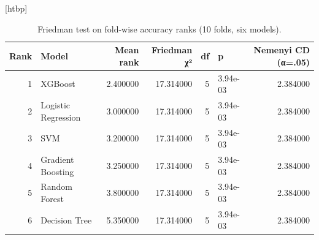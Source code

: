 \begin{table}
\small[htbp]
\caption{Friedman test on fold-wise accuracy ranks (10 folds, six models).}
\label{tab:A02_friedman}
\begin{tabular}{rlrrrlr}
\toprule
Rank & Model & Mean rank & Friedman χ² & df & p & Nemenyi CD (α=.05) \\
\midrule
1 & XGBoost & 2.400000 & 17.314000 & 5 & 3.94e-03 & 2.384000 \\
2 & Logistic Regression & 3.000000 & 17.314000 & 5 & 3.94e-03 & 2.384000 \\
3 & SVM & 3.200000 & 17.314000 & 5 & 3.94e-03 & 2.384000 \\
4 & Gradient Boosting & 3.250000 & 17.314000 & 5 & 3.94e-03 & 2.384000 \\
5 & Random Forest & 3.800000 & 17.314000 & 5 & 3.94e-03 & 2.384000 \\
6 & Decision Tree & 5.350000 & 17.314000 & 5 & 3.94e-03 & 2.384000 \\
\bottomrule
\end{tabular}
\end{table}
